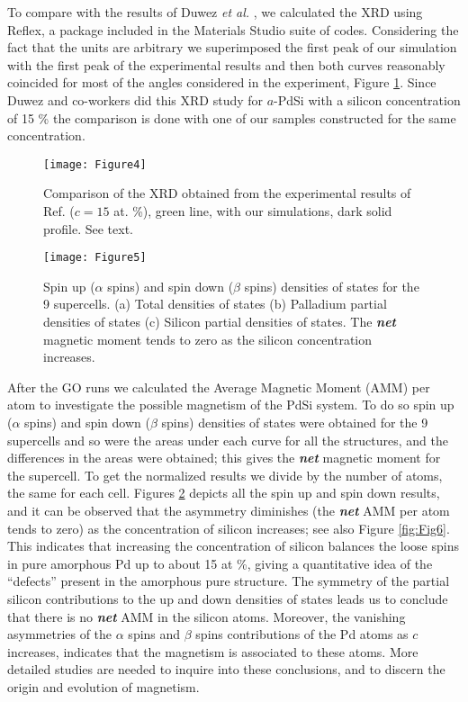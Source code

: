 \documentclass[fleqn,12pt]{wlscirep}
\begin{document}
To compare with the results of Duwez \textit{et al.} \cite{Duwez_1965}, we calculated the XRD using Reflex, a package included in the Materials Studio suite of codes. Considering the fact that the units are arbitrary we superimposed the first peak of our simulation with the first peak of the experimental results and then both curves reasonably coincided for most of the angles considered in the experiment, Figure \ref{fig:Fig4}. Since Duwez and co-workers did this XRD study for $a$-PdSi with a silicon concentration of 15 \% the comparison is done with one of our samples constructed for the same concentration.

\begin{figure}[H]
\centering
\texttt{[image: Figure4]}
\caption{Comparison of the XRD obtained from the experimental results of Ref. \cite{Duwez_1965} ($c = 15$ at. \%), green line, with our simulations, dark solid profile. See text.}
\label{fig:Fig4}
\end{figure}

\begin{figure}[H]
\centering
\texttt{[image: Figure5]}
\caption{Spin up ($\alpha$ spins) and spin down ($\beta$ spins) densities of states for the 9 supercells. (a) Total densities of states (b) Palladium partial densities of states (c) Silicon partial densities of states. The \textbf{\textit{net}} magnetic moment tends to zero as the silicon concentration increases.}
\label{fig:Fig5}
\end{figure}

After the GO runs we calculated the Average Magnetic Moment (AMM) per atom to investigate the possible magnetism of the PdSi system. To do so spin up ($\alpha$ spins) and spin down ($\beta$ spins) densities of states were obtained for the 9 supercells and so were the areas under each curve for all the structures, and the differences in the areas were obtained; this gives the \textbf{\textit{net}} magnetic moment for the supercell. To get the normalized results we divide by the number of atoms, the same for each cell. Figures \ref{fig:Fig5} depicts all the spin up and spin down results, and it can be observed that the asymmetry diminishes (the \textbf{\textit{net}} AMM per atom tends to zero) as the concentration of silicon increases; see also Figure \ref{fig:Fig6}. This indicates that increasing the concentration of silicon balances the loose spins in pure amorphous Pd up to about 15 at \%, giving a quantitative idea of the ``defects'' present in the amorphous pure structure. The symmetry of the partial silicon contributions to the up and down densities of states leads us to conclude that there is no \textbf{\textit{net}} AMM in the silicon atoms. Moreover, the vanishing asymmetries of the $\alpha$ spins and $\beta$ spins contributions of the Pd atoms as $c$ increases, indicates that the magnetism is associated to these atoms. More detailed studies are needed to inquire into these conclusions, and to discern the origin and evolution of magnetism.
\end{document}
